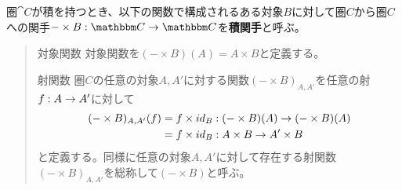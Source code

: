 	\begin{define}[積関手]
		圏$\cat{C}$が積を持つとき、以下の関数で構成されるある対象$B$に対して圏$C$から圏$C$への関手$\functor{-\times B}{C}{C}$を\textbf{積関手}と呼ぶ。
		\begin{quote}
			\begin{mydescription}
			\item[対象関数] 対象関数を$(-\times B)(A)=A\times B$と定義する。
			\item[射関数] 圏$C$の任意の対象$A,A'$に対する関数$(-\times B)_{A,A'}$を任意の射$f:A\rightarrow A'$に対して
			\begin{align*}
				(-\times B)_{A,A'}(f)&=f\times id_B:(-\times B)(A)\rightarrow (-\times B)(A)\\
				&=f\times id_B:A\times B\rightarrow A'\times B
			\end{align*}
			と定義する。同様に任意の対象$A,A'$に対して存在する射関数$(-\times B)_{A,A'}$を総称して$(-\times B)$と呼ぶ。
			\begin{center}
\end{center}
\end{mydescription}
\end{quote}
\end{define}
